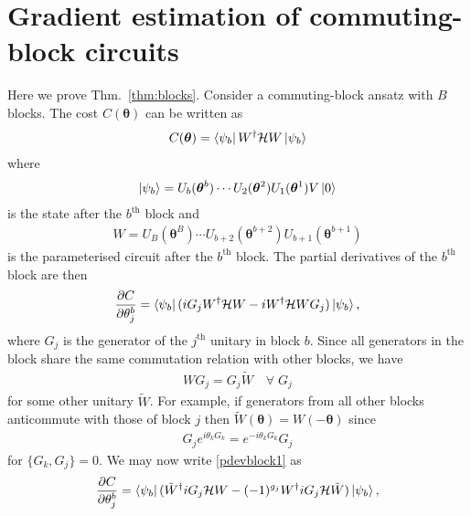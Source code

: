 \documentclass[a4paper,twocolumn,11pt]{quantumarticle}
\renewcommand{\vec}{\boldsymbol}
\begin{document}

\section{Gradient estimation of commuting-block circuits}\label{app:blockgrads}
Here we prove Thm.\ \ref{thm:blocks}. Consider a commuting-block ansatz with $B$ blocks. The cost $C(\vec{\theta})$ can be written as
%
\begin{align}
    C(\vec{\theta}) = \bra{\psi_b}W^\dagger \mathcal{H} W \ket{\psi_b}
\end{align}
%
where 
%
\begin{align}
    \ket{\psi_b}=U_{b}(\vec{\theta}^{b})\cdots U_2(\vec{\theta}^2)U_1(\vec{\theta}^1) V\ket{0}
\end{align}
%
is the state after the $b^{\text{th}}$ block and 
%
\begin{align}\label{wdef}
    W = U_{B}(\vec{\theta}^{B})\cdots U_{b+2}(\vec{\theta}^{b+2})U_{b+1}(\vec{\theta}^{b+1})
\end{align}
%
is the parameterised circuit after the $b^{\text{th}}$ block. The partial derivatives of the $b^{\text{th}}$ block are then 
%
\begin{align}\label{pdevblock1}
\frac{\partial C}{\partial \theta^b_j} = \bra{\psi_b}(iG_jW^\dagger \mathcal{H} W -iW^\dagger \mathcal{H}WG_j)\ket{\psi_b},
\end{align}
%
where $G_j$ is the generator of the $j^{\text{th}}$ unitary in block $b$. Since all generators in the block share the same commutation relation with other blocks, we have 
%
\begin{align}
    WG_j = G_j\tilde{W} \quad \forall\;G_j
\end{align}
%
for some other unitary $\tilde{W}$. For example, if generators from all other blocks anticommute with those of block $j$ then
$\tilde{W}(\vec{\theta})=W(-\vec{\theta})$
since
%
\begin{align}
    G_je^{i\theta_k G_k} = e^{-i\theta_k G_k}G_j
\end{align}
%
for $\{G_k,G_j\}=0$. We may now write \eqref{pdevblock1} as 
%
\begin{align}\label{pdevblock2}
\frac{\partial C}{\partial \theta^b_j} 
= \bra{\psi_b}(\tilde{W}^\dagger iG_j\mathcal{H} W -(-1)^{g_j} W^\dagger iG_j\mathcal{H}\tilde{W})\ket{\psi_b},
\end{align}
\end{document}
